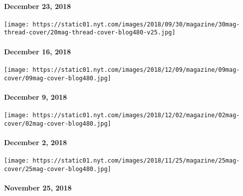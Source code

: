 \hypertarget{december-23-2018}{%
\paragraph{December 23, 2018}\label{december-23-2018}}

\href{https://www.nytimes.com/issue/magazine/2019/01/03/121618-issue}{}

\texttt{[image: https://static01.nyt.com/images/2018/09/30/magazine/30mag-thread-cover/20mag-thread-cover-blog480-v25.jpg]}

\hypertarget{december-16-2018}{%
\paragraph{December 16, 2018}\label{december-16-2018}}

\href{https://www.nytimes.com/issue/magazine/2018/12/07/the-12918-issue}{}

\texttt{[image: https://static01.nyt.com/images/2018/12/09/magazine/09mag-cover/09mag-cover-blog480.jpg]}

\hypertarget{december-9-2018}{%
\paragraph{December 9, 2018}\label{december-9-2018}}

\href{https://www.nytimes.com/issue/magazine/2018/12/07/the-12218-issue}{}

\texttt{[image: https://static01.nyt.com/images/2018/12/02/magazine/02mag-cover/02mag-cover-blog480.jpg]}

\hypertarget{december-2-2018}{%
\paragraph{December 2, 2018}\label{december-2-2018}}

\href{https://www.nytimes.com/issue/magazine/2018/11/21/the-112518-issue}{}

\texttt{[image: https://static01.nyt.com/images/2018/11/25/magazine/25mag-cover/25mag-cover-blog480.jpg]}

\hypertarget{november-25-2018}{%
\paragraph{November 25, 2018}\label{november-25-2018}}

\href{https://www.nytimes.com/issue/magazine/2018/11/16/the-111818-issue}{}


